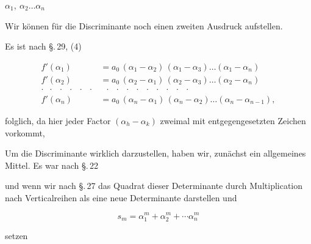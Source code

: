 
$\alpha_1,\ \alpha_2 \ldots \alpha_n$ 

Wir k\"onnen f\"ur die Discriminante noch einen zweiten Ausdruck
aufstellen.

Es ist nach \S.\,29, (4)

\[
\begin{aligned}
f'(\alpha_1) &= a_0\,(\alpha_1 - \alpha_2)\,(\alpha_1 - \alpha_3)\ldots(\alpha_1 - \alpha_n)\\
f'(\alpha_2) &= a_0\,(\alpha_2 - \alpha_1)\,(\alpha_2 - \alpha_3)\ldots(\alpha_2 - \alpha_n)\\
\cdot\;\;\cdot\;\;\cdot\;\;\cdot\;\;\cdot\;\;\cdot &\;\;\cdot\;\;\cdot\;\;\cdot\;\;\cdot\;\;\cdot\;\;\cdot\;\;\cdot\;\;\cdot\;\;\cdot\\
f'(\alpha_n) &= a_0\,(\alpha_n - \alpha_1)\,(\alpha_n - \alpha_2)\ldots(\alpha_n - \alpha_{n-1}),
\end{aligned}
\]

folglich, da hier jeder Factor $(\alpha_h - \alpha_k)$ zweimal mit entgegen\-gesetzten
Zeichen vorkommt,


Um die Discriminante wirklich darzustellen, haben wir, zu\-n\"achst ein allgemeines Mittel. %
Es war nach \S.\,22


und wenn wir nach \S.\,27 das Quadrat dieser Determinante durch
Multiplication nach Verticalreihen als eine neue Determinante
darstellen und

\[
s_m = \alpha_1^m + \alpha_2^m + \cdots \alpha_n^m
\]

setzen

